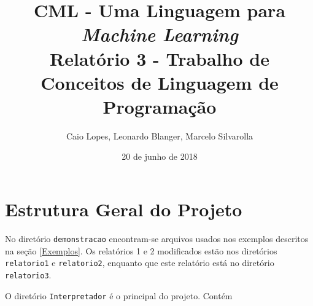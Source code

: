 \documentclass[12pt]{article}
\title{CML - Uma Linguagem para {\it Machine Learning} \\ \Large Relatório 3 - Trabalho de Conceitos de Linguagem de Programação}
\author{Caio Lopes, Leonardo Blanger, Marcelo Silvarolla}
\date{20 de junho de 2018}
\begin{document}
\lstset{
  basicstyle=\ttfamily,
  columns=fullflexible,
  keepspaces=true,
  mathescape
}

\maketitle
\tableofcontents
\newpage
\section{Estrutura Geral do Projeto}

No diretório \texttt{demonstracao} encontram-se arquivos usados nos exemplos descritos na seção \ref{Exemplos}. Os relatórios 1 e 2 modificados estão nos diretórios \texttt{relatorio1} e \texttt{relatorio2}, enquanto que este relatório está no diretório \texttt{relatorio3}.

O diretório \texttt{Interpretador} é o principal do projeto. Contém
\end{document}
